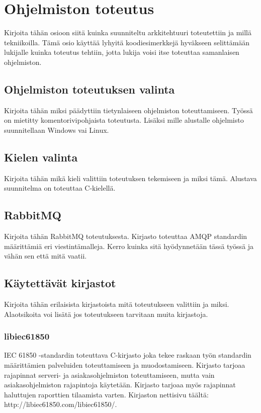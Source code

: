 \chapter{Ohjelmiston toteutus}
\label{ch:ohjelmiston toteutus}
Kirjoita tähän osioon siitä kuinka suunniteltu arkkitehtuuri toteutettiin ja millä tekniikoilla. Tämä osio käyttää lyhyitä koodiesimerkkejä hyväkseen selittämään lukijalle kuinka toteutus tehtiin, jotta lukija voisi itse toteuttaa samanlaisen ohjelmiston.

\section{Ohjelmiston toteutuksen valinta}
Kirjoita tähän miksi päädyttiin tietynlaiseen ohjelmiston toteuttamiseen. Työssä on mietitty komentorivipohjaista toteutusta. Lisäksi mille alustalle ohjelmisto suunnitellaan Windows vai Linux.

\section{Kielen valinta}
Kirjoita tähän mikä kieli valittiin toteutuksen tekemiseen ja miksi tämä. Alustava suunnitelma on toteuttaa C-kielellä.

\section{RabbitMQ}
Kirjoita tähän RabbitMQ toteutuksesta. Kirjasto toteuttaa AMQP standardin määrittämiä eri viestintämalleja. Kerro kuinka sitä hyödynnetään tässä työssä ja vähän sen että mitä vaatii.

\section{Käytettävät kirjastot}
Kirjoita tähän erilaisista kirjastoista mitä toteutukseen valittiin ja miksi. Alaotsikoita voi lisätä jos toteutukseen tarvitaan muita kirjastoja.

\subsection{libiec61850}
IEC 61850 -standardin toteuttava C-kirjasto joka tekee raskaan työn standardin määrittämien palveluiden toteuttamiseen ja muodostamiseen. Kirjasto tarjoaa rajapinnat serveri- ja asiakasohjelmiston toteuttamiseen, mutta vain asiakasohjelmiston rajapintoja käytetään. Kirjasto tarjoaa myös rajapinnat haluttujen raporttien tilaamista varten. Kirjaston nettisivu täältä: http://libiec61850.com/libiec61850/.

